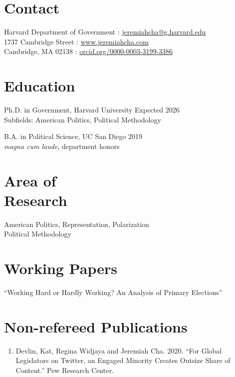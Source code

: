 \documentclass[margin, line]{res}
\begin{document}
\begin{resume}

\section{Contact} 
Harvard Department of Government \hfill \Letter: \href{mailto:jeremiahcha@g.harvard.edu}{jeremiahcha@g.harvard.edu}\\
1737 Cambridge Street \hfill \Mundus: \href{httsp://www.jeremiahcha.com}{www.jeremiahcha.com}\\
Cambridge, MA 02138 \hfill \Mundus: \href{https://orcid.org/0000-0003-3199-3386}{orcid.org/0000-0003-3199-3386}

\section{Education} 
Ph.D. in Government, Harvard University \hfill Expected 2026\\
\hspace*{5mm}Subfields: American Politics, Political Methodology

B.A. in Political Science, UC San Diego \hfill 2019\\
\hspace*{5mm}\textit{magna cum laude}, department honors

\section{Area of \\Research} 
American Politics, Representation, Polarization\\
Political Methodology

\section{Working Papers} 
``Working Hard or Hardly Working? An Analysis of Primary Elections''

\section{Non-refereed Publications}
\begin{enumerate}

\item Devlin, Kat, Regina Widjaya and Jeremiah Cha. 2020. ``For Global Legislators on Twitter, an Engaged Minority Creates Outsize Share of Content.'' Pew Research Center. 


\end{enumerate}
\end{resume}
\end{document}
